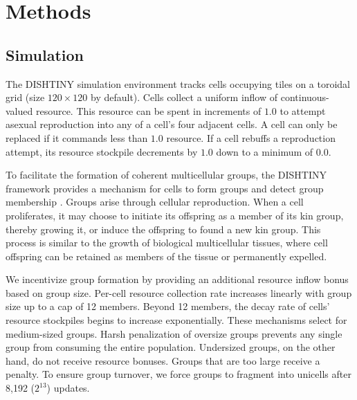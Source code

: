 



\section{Methods} \label{sec:methods;ch:measuring-cna}

\subsection{Simulation}




The DISHTINY simulation environment tracks cells occupying tiles on a toroidal grid (size $120\times120$ by default).
Cells collect a uniform inflow of continuous-valued resource.
This resource can be spent in increments of $1.0$ to attempt asexual reproduction into any of a cell's four adjacent cells.
A cell can only be replaced if it commands less than $1.0$ resource.
If a cell rebuffs a reproduction attempt, its resource stockpile decrements by $1.0$ down to a minimum of $0.0$.

To facilitate the formation of coherent multicellular groups, the DISHTINY framework provides a mechanism for cells to form groups and detect group membership .
Groups arise through cellular reproduction.
When a cell proliferates, it may choose to initiate its offspring as a member of its kin group, thereby growing it, or induce the offspring to found a new kin group.
This process is similar to the growth of biological multicellular tissues, where cell offspring can be retained as members of the tissue or permanently expelled.

We incentivize group formation by providing an additional resource inflow bonus based on group size.
Per-cell resource collection rate increases linearly with group size up to a cap of 12 members.
Beyond 12 members, the decay rate of cells' resource stockpiles begins to increase exponentially.
These mechanisms select for medium-sized groups.
Harsh penalization of oversize groups prevents any single group from consuming the entire population.
Undersized groups, on the other hand, do not receive resource bonuses.
Groups that are too large receive a penalty.
To ensure group turnover, we force groups to fragment into unicells after 8,192 ($2^{13}$) updates.


